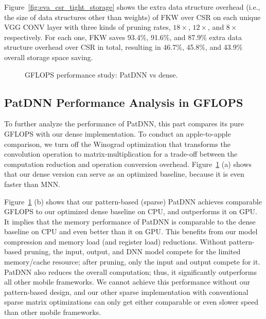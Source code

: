 \documentclass[sigplan,screen]{acmart}
\begin{document}
Figure~\ref{fig:eva_csr_tight_storage} shows the extra data structure overhead 
(i.e., the size of data structures other than weights) of FKW over CSR on each unique VGG CONV layer with three kinds of pruning rates, $18\times$, $12\times$, and $8\times$ respectively. For each one, FKW saves 93.4\%, 91.6\%, and 87.9\% extra data structure overhead over CSR in total, resulting in 46.7\%, 45.8\%, and 43.9\% overall storage space saving.


\begin{figure}[t]
    \centering
        \caption{GFLOPS performance study: PatDNN vs dense.}
    \label{fig:eva_dense_pattern_compare}
\end{figure}



\subsection{PatDNN Performance Analysis in GFLOPS}
To further analyze the performance of PatDNN, this part compares its pure GFLOPS with our dense implementation. To conduct an apple-to-apple comparison, we turn off the Winograd optimization that transforms the convolution operation to matrix-multiplication for a trade-off between the computation reduction and operation conversion overhead. 
Figure~\ref{fig:eva_dense_pattern_compare} (a) shows that our dense version can serve as an optimized baseline, because it is even faster than MNN.

Figure~\ref{fig:eva_dense_pattern_compare} (b) shows that our pattern-based (sparse) PatDNN achieves comparable GFLOPS to our optimized dense baseline on CPU, and outperforms it on GPU. It implies that the memory performance of PatDNN is comparable to the dense baseline on CPU and even better than it on GPU. This benefits from our model compression and memory load (and register load) reductions. Without pattern-based pruning, the input, output, and DNN model compete for the limited memory/cache resource; after pruning, only the input and output compete for it. PatDNN also reduces the overall computation; thus, it significantly outperforms all other mobile frameworks. We cannot achieve this performance without our pattern-based design, and our other sparse implementation with conventional sparse matrix optimizations can only get either comparable or even slower speed than other mobile frameworks.
\end{document}
